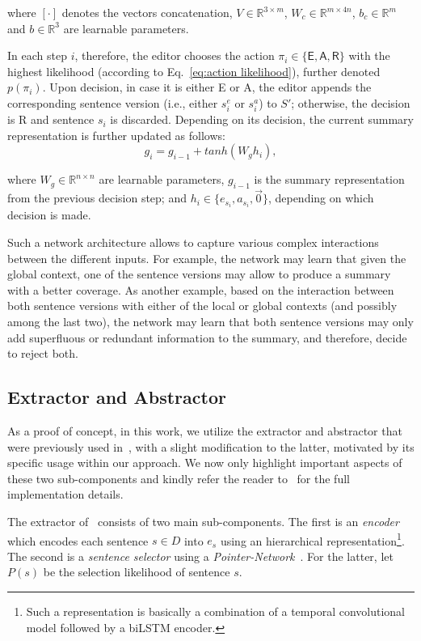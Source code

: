 \documentclass{article}
\begin{document}
where $[\cdot]$ denotes the vectors concatenation, $V\in\mathbb{R}^{3\times{m}}$, $W_c\in\mathbb{R}^{m\times{4n}}$, $b_c\in\mathbb{R}^{m}$ and $b\in\mathbb{R}^{3}$ are learnable parameters.

In each step $i$, therefore, the editor chooses the action $\pi_i\in\{\textsf{E},\textsf{A},\textsf{R}\}$ with the highest likelihood (according to Eq.~\ref{eq:action likelihood}), further denoted $p(\pi_i)$. Upon decision, in case it is either \textsf{E} or \textsf{A}, the editor appends the corresponding sentence version (i.e., either $s_{i}^{e}$ or $s_{i}^{a}$) to $S'$; otherwise, the decision is \textsf{R} and sentence $s_{i}$ is discarded. Depending on its decision, the current summary representation is further updated as follows:
\begin{equation}\label{eq:doc rep}
  g_{i}=g_{i-1}+tanh\left(W_gh_i\right),
\end{equation}

where $W_g\in\mathbb{R}^{n\times{n}}$ are learnable parameters, $g_{i-1}$ is the summary representation from the previous decision step; and $h_i\in\{e_{s_i},a_{s_i},\vec{0}\}$, depending on which decision is made.


Such a network architecture allows to capture various complex interactions between the different inputs. 
For example, the network may learn that given the global context, one of the sentence versions may allow to produce a summary with a better coverage. As another example, based on the interaction between both sentence versions with either of the local or global contexts (and possibly among the last two), the network may learn that both sentence versions may only add superfluous or redundant information to the summary, and therefore, decide to reject both.

\subsection{Extractor and Abstractor}\label{sec:EA sum}
As a proof of concept, in this work, we utilize the extractor and abstractor that were previously used in~\cite{ChenFastAS2018}, with a slight modification to the latter, motivated by its specific usage within our approach. 
We now only highlight important aspects of these two sub-components and kindly refer the reader to~\cite{ChenFastAS2018} for the full implementation details.

The extractor of~\cite{ChenFastAS2018} consists of two main sub-components. The first is an \textit{encoder} which encodes each sentence $s\in{D}$ into $e_{s}$ using an hierarchical representation\footnote{\small Such a representation is basically a combination of a temporal convolutional model followed by a biLSTM encoder.}. The second is a \textit{sentence selector} using a \textit{Pointer-Network}~\cite{vinyals2015pointer}. For the latter, let $P(s)$ be the selection likelihood of sentence $s$.
\end{document}

